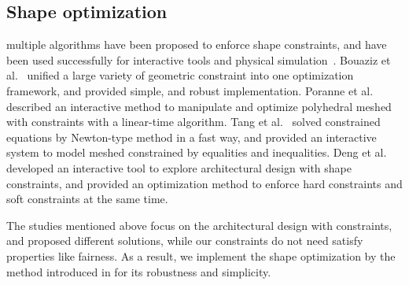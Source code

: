 \subsection{Shape optimization}
multiple algorithms have been proposed to enforce shape constraints, and have been used successfully for interactive tools and physical simulation~\cite{Botsch:2006:PCP:1281957.1281959,Igarashi:2005:ASM:1186822.1073323}. 
Bouaziz et al.~\cite{Bouaziz:2012:SSD:2346796.2346802} unified a large variety of geometric constraint into one optimization framework, and provided simple, and robust implementation. 
Poranne et al.~\cite{Poranne2013Interactive} described an interactive method to manipulate and optimize polyhedral meshed with constraints with a linear-time algorithm. 
Tang et al.~\cite{Tang:2014:FPM:2601097.2601213} solved constrained equations by Newton-type method in a fast way, and provided an interactive system to model meshed constrained by equalities and inequalities. 
Deng et al.~\cite{Deng2015} developed an interactive tool to explore architectural design with shape constraints, and provided an optimization method to enforce hard constraints and soft constraints at the same time. 

The studies mentioned above focus on the architectural design with constraints, and proposed different solutions, while our constraints do not need satisfy properties like fairness. As a result, we implement the shape optimization by the method introduced in \cite{Bouaziz:2012:SSD:2346796.2346802} for its robustness and simplicity.



